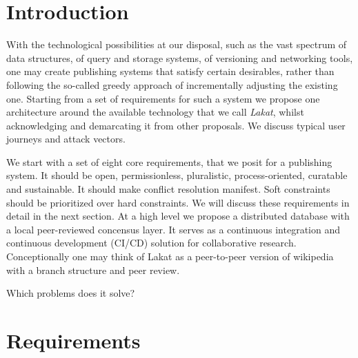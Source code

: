\documentclass[14pt]{article}
\title{\sc{Lakat}\break \sc{A Publishing Architecture}}
\author{Leonhard Horstmeyer}
\date{\today}
\begin{document}
\maketitle

\begin{abstract}
    
\end{abstract}
\section{Introduction}

With the technological possibilities at our disposal, such as the vast spectrum of data structures, of query and storage systems, of versioning and networking tools, one may create publishing systems that satisfy certain desirables, rather than following the so-called greedy approach of incrementally adjusting the existing one. Starting from a set of requirements for such a system we propose one architecture around the available technology that we call \textit{Lakat}, whilst acknowledging and demarcating it from other proposals. We discuss typical user journeys and attack vectors.

We start with a set of eight core requirements, that we posit for a publishing system. It should be open, permissionless, pluralistic, process-oriented, curatable and sustainable. It should make conflict resolution manifest. Soft constraints should be prioritized over hard constraints. We will discuss these requirements in detail in the next section. At a high level we propose a distributed database with a local peer-reviewed concensus layer. It serves as a continuous integration and continuous development (CI/CD) solution for collaborative research. Conceptionally one may think of Lakat as a peer-to-peer version of wikipedia with a branch structure and peer review.

Which problems does it solve?

\section{Requirements}
\end{document}

